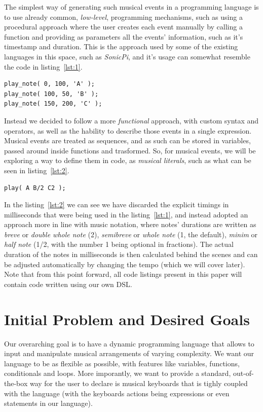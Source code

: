 \documentclass[a4paper,UKenglish,cleveref, autoref]{oasics-v2019}
\begin{document}
The simplest way of generating such musical events in a programming language is to use already common, \textit{low-level}, programming mechanisms, such as using a procedural approach where the user creates each event manually by calling a function and providing as parameters all the events' information, such as it's timestamp and duration. This is the approach used by some of the existing languages in this space, such as \textit{SonicPi}\cite{Aaron2014TemporalSF}, and it's usage can somewhat resemble the code in listing~\ref{lst:1}.

\begin{lstlisting}[caption={Example of a hypothetical imperative API for creating events},label=lst:1,captionpos=t,abovecaptionskip=-\medskipamount]
play_note( 0, 100, 'A' );
play_note( 100, 50, 'B' );
play_note( 150, 200, 'C' );
\end{lstlisting}

Instead we decided to follow a more \textit{functional} approach, with custom syntax and operators, as well as the hability to describe those events in a single expression. Musical events are treated as sequences, and as such can be stored in variables, passed around inside functions and trasformed. So, for musical events, we will be exploring a way to define them in code, as \textit{musical literals}, such as what can be seen in listing~\ref{lst:2}.

\begin{lstlisting}[caption={Our proposed declarative syntax that calculates timings implicitly},label=lst:2,captionpos=t,abovecaptionskip=-\medskipamount]
play( A B/2 C2 );
\end{lstlisting}

In the listing~\ref{lst:2} we can see we have discarded the explicit timings in milliseconds that were being used in the listing~\ref{lst:1}, and instead adopted an approach more in line with music notation, where notes' durations are written as \textit{breve} or \textit{double whole note} (2), \textit{semibreve} or \textit{whole note} (1, the default), \textit{minim} or \textit{half note} (1/2, with the number 1 being optional in fractions). The actual duration of the notes in milliseconds is then calculated behind the scenes and can be adjusted automatically by changing the tempo (which we will cover later). Note that from this point forward, all code listings present in this paper will contain code written using our own DSL.

\section{Initial Problem and Desired Goals}
Our overarching goal is to have a dynamic programming language that allows to input and manipulate musical arrangements of varying complexity. We want our language to be as flexible as possible, with features like variables, functions, conditionals and loops. More imporantly, we want to provide a standard, out-of-the-box way for the user to declare is musical keyboards that is tighly coupled with the language (with the keyboards actions being expressions or even statements in our language).
\end{document}
